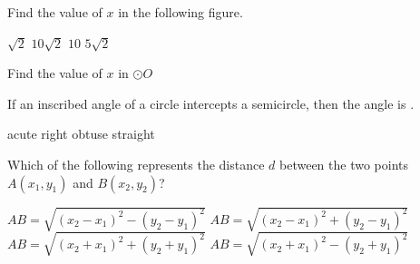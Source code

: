 \begin{questions}
\vspace*{-2.7cm}\hspace*{11cm} 
\question Find the value of $x$ in the following figure. 
\begin{choices}  
\choice $\sqrt{2} $ 
\choice $10\sqrt{2} $ 
\choice $10$ 
\CorrectChoice $5 \sqrt{2} $ 
\end{choices}

\vspace*{-3cm}\hspace*{11cm}

\newpage 
\question Find the value of $x$ in $\odot O$
\begin{choices}  
\end{choices}

\vspace*{-2.7cm}\hspace*{11cm}

\question If an inscribed angle of a circle intercepts a semicircle, then the angle is \blank. 
\begin{multicols}{4}
\begin{choices}  
\choice acute
\CorrectChoice right
\choice obtuse
\choice straight 
\end{choices}
\end{multicols} 

\question Which of the following represents the distance $d$ between the two points $A(x_1, y_1)$ and $B(x_2, y_2)$?   
\begin{multicols}{2}
\begin{choices}  
\choice $AB = \sqrt{(x_2-x_1)^2 - (y_2-y_1)^2}$
\CorrectChoice $AB = \sqrt{(x_2-x_1)^2 + (y_2-y_1)^2}$
\choice $AB = \sqrt{(x_2+x_1)^2 + (y_2+y_1)^2}$
\choice $AB = \sqrt{(x_2+x_1)^2 - (y_2+y_1)^2}$
\end{choices}
\end{multicols} 


\end{questions}
